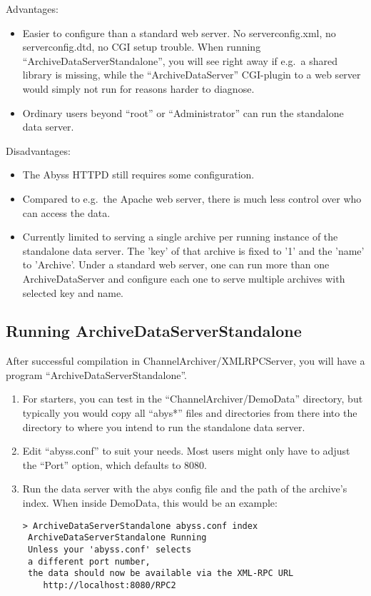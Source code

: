 \noindent Advantages:
\begin{itemize}
\item Easier to configure than a standard web server. No
  serverconfig.xml, no serverconfig.dtd, no CGI setup trouble. When running
  ``ArchiveDataServerStandalone'', you will see right away if e.g.\ a
  shared library is missing, while the ``ArchiveDataServer''
  CGI-plugin to a web server would simply not run for reasons harder
  to diagnose.
\item Ordinary users beyond ``root'' or ``Administrator''
  can run the standalone data server.
\end{itemize}

\noindent Disadvantages:
\begin{itemize}
\item The Abyss HTTPD still requires some configuration.
\item Compared to e.g.\ the Apache web server, there is much less
  control over who can access the data.
\item Currently limited to serving a single archive per running
  instance of the standalone data server.
  The 'key' of that archive is fixed to '1' and  the 'name' to 'Archive'.
  Under a standard web server, one can run more than one
  ArchiveDataServer and configure each one to serve multiple archives
  with selected key and name.
\end{itemize}

\subsection{Running ArchiveDataServerStandalone} %
After successful compilation in ChannelArchiver/XMLRPCServer, you will
have a program ``ArchiveDataServerStandalone''.

\begin{enumerate}
\item For starters, you can test in the ``ChannelArchiver/DemoData''
      directory, but typically you would copy all ``abys*'' files and
      directories from there into the directory to where you intend to
      run the standalone data server.
\item Edit ``abyss.conf'' to suit your needs. Most users might only
      have to adjust the ``Port'' option, which defaults to 8080.
\item Run the data server with the abys config file and the path of
  the archive's index. When inside DemoData, this would be an example:
\begin{lstlisting}[keywordstyle=\sffamily]
> ArchiveDataServerStandalone abyss.conf index 
 ArchiveDataServerStandalone Running
 Unless your 'abyss.conf' selects
 a different port number,
 the data should now be available via the XML-RPC URL
    http://localhost:8080/RPC2
\end{lstlisting}
\end{enumerate}

